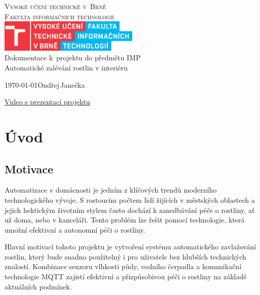 \documentclass[a4paper, 11pt]{article}
\begin{document}
\begin{titlepage}
	\begin{center}
		{\Huge \textsc{Vysoké učení technické v~Brně}\\}
		{\huge \textsc{Fakulta informačních technologií}\\}
        \includegraphics[width=0.5\textwidth]{img/FIT_barevne_CMYK_CZ.eps}\\
		{\LARGE Dokumentace k~projektu do předmětu IMP\\}
		{\Huge Automatické zalévání rostlin v interiéru\\}
	\end{center}
	{\Large \today \hfill Ondřej\,Janečka}
	
	\vspace{1cm}
	\begin{center}
		\href{https://drive.google.com/drive/folders/1NW7rmXldFyzUyTPD2Msdj684g9g_p-tH?usp=sharing}{Video s prezentací projektu}
	\end{center}

\end{titlepage}

\newpage
\section{Úvod}

\subsection{Motivace}
Automatizace v domácnosti je jedním z klíčových trendů moderního technologického vývoje. S rostoucím počtem lidí žijících v městských oblastech 
a jejich hektickým životním stylem často dochází k zanedbávání péče o rostliny, ať už doma, nebo v kanceláři. Tento problém lze řešit pomocí technologie, 
která umožní efektivní a autonomní péči o rostliny.

Hlavní motivací tohoto projektu je vytvoření systému automatického zavlažování rostlin, který bude snadno použitelný i pro uživatele bez hlubších technických znalostí. 
Kombinace senzoru vlhkosti půdy, vodního čerpadla a komunikační technologie MQTT zajistí efektivní a přizpůsobivou péči o rostliny na základě aktuálních podmínek.
\end{document}
